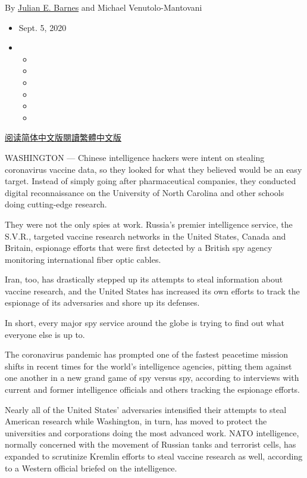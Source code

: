By \href{https://www.nytimes3xbfgragh.onion/by/julian-e-barnes}{Julian
E. Barnes} and Michael Venutolo-Mantovani

\begin{itemize}
\item
  Sept. 5, 2020
\item
  \begin{itemize}
  \item
  \item
  \item
  \item
  \item
  \item
  \end{itemize}
\end{itemize}

\href{https://cn.nytimes3xbfgragh.onion/usa/20200907/coronavirus-vaccine-espionage/}{阅读简体中文版}\href{https://cn.nytimes3xbfgragh.onion/usa/20200907/coronavirus-vaccine-espionage/zh-hant/}{閱讀繁體中文版}

WASHINGTON --- Chinese intelligence hackers were intent on stealing
coronavirus vaccine data, so they looked for what they believed would be
an easy target. Instead of simply going after pharmaceutical companies,
they conducted digital reconnaissance on the University of North
Carolina and other schools doing cutting-edge research.

They were not the only spies at work. Russia's premier intelligence
service, the S.V.R., targeted vaccine research networks in the United
States, Canada and Britain, espionage efforts that were first detected
by a British spy agency monitoring international fiber optic cables.

Iran, too, has drastically stepped up its attempts to steal information
about vaccine research, and the United States has increased its own
efforts to track the espionage of its adversaries and shore up its
defenses.

In short, every major spy service around the globe is trying to find out
what everyone else is up to.

The coronavirus pandemic has prompted one of the fastest peacetime
mission shifts in recent times for the world's intelligence agencies,
pitting them against one another in a new grand game of spy versus spy,
according to interviews with current and former intelligence officials
and others tracking the espionage efforts.

Nearly all of the United States' adversaries intensified their attempts
to steal American research while Washington, in turn, has moved to
protect the universities and corporations doing the most advanced work.
NATO intelligence, normally concerned with the movement of Russian tanks
and terrorist cells, has expanded to scrutinize Kremlin efforts to steal
vaccine research as well, according to a Western official briefed on the
intelligence.

